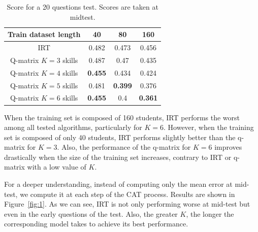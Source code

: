 \documentclass{sig-alternate}
\begin{document}
\begin{table}[H]
\centering\begin{tabular}{cccc}
\bfseries Train dataset length & 40 & 80 & 160\\
\hline
IRT & 0.482 & 0.473 & 0.456\\
Q-matrix $K = 3$ skills & 0.487 & 0.47 & 0.435\\
Q-matrix $K = 4$ skills & \textbf{0.455} & 0.434 & 0.424\\
Q-matrix $K = 5$ skills & 0.481 & \textbf{0.399} & 0.376\\
Q-matrix $K = 6$ skills & \textbf{0.455} & 0.4 & \textbf{0.361}\\
\end{tabular}
\caption{Score for a 20 questions test. Scores are taken at midtest.}
\label{tab:20q}
\end{table}

When the training set is composed of 160 students, IRT performs the worst among all tested algorithms, particularly for $K = 6$. However, when the training set is composed of only 40 students, IRT performs slightly better than the q-matrix for $K = 3$. Also, the performance of the q-matrix for $K = 6$ improves drastically when the size of the training set increases, contrary to IRT or q-matrix with a low value of $K$.

For a deeper understanding, instead of computing only the mean error at mid-test, we compute it at each step of the CAT process. Results are shown in Figure~\ref{fig:1}. As we can see, IRT is not only performing worse at mid-test but even in the early questions of the test. Also, the greater $K$, the longer the corresponding model takes to achieve its best performance. 
\end{document}
